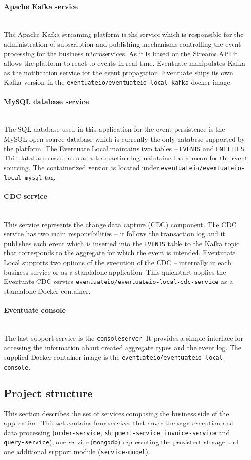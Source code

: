 \documentclass[oneside,
  digital, %
  table,   %
  nolof,     %
  nolot,     %
]{fithesis3}
\newcommand{\newlinepar}[1]{\paragraph{#1}\needspace{4\baselineskip}\mbox{}\\}
\begin{document}
\newlinepar{Apache Kafka service}

The Apache Kafka streaming platform is the service which is responsible for the administration of subscription and publishing mechanisms controlling the event processing for the business microservices. As it is based on the Streams API it allows the platform to react to events in real time. Eventuate manipulates Kafka as the notification service for the event propagation. Eventuate ships its own Kafka version in the \texttt{eventuateio/eventuateio-local-kafka} docker image.

\newlinepar{MySQL database service}

The SQL database used in this application for the event persistence is the MySQL open-source database which is currently the only database supported by the platform. The Eventuate Local maintains two tables -- \texttt{EVENTS} and \texttt{ENTITIES}. This database serves also as a transaction log maintained as a mean for the event sourcing. The containerized version is located under \texttt{eventuateio/eventuateio-local-mysql} tag.

\newlinepar{CDC service}

This service represents the change data capture (CDC) component. The CDC service has two main responsibilities -- it follows the transaction log and it publishes each event which is inserted into the \texttt{EVENTS} table to the Kafka topic that corresponds to the aggregate for which the event is intended. Eventutate Local supports two options of the execution of the CDC -- internally in each business service or as a standalone application. This quickstart applies the Eventuate CDC service \texttt{eventuateio/eventuateio-local-cdc-service} as a standalone Docker container.

\newlinepar{Eventuate console}

The last support service is the \texttt{consoleserver}. It provides a simple interface for accessing the information about created aggregate types and the event log. The supplied Docker container image is the \texttt{eventuateio/eventuateio-local-console}.


\subsection{Project structure}

This section describes the set of services composing the business side of the application. This set contains four services that cover the saga execution and data processing (\texttt{order-service}, \texttt{shipment-service}, \texttt{invoice-service} and \texttt{query-service}), one service (\texttt{mongodb}) representing the persistent storage and one additional support module (\texttt{service-model}).
\end{document}
